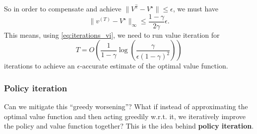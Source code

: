 \documentclass[../main/main]{subfiles}
\begin{document}
So in order to compensate and achieve $\|V^{\hat \pi} - V^{\star}\| \le \epsilon$, we must have
\[
    \|v^{(T)} - V^\star\|_{\infty} \le \frac{1-\gamma}{2 \gamma} \epsilon.
\]
This means, using \ref{eq:iterations_vi}, we need to run value iteration for
\[
    T = O\left( \frac{1}{1-\gamma} \log\left(\frac{\gamma}{\epsilon (1-\gamma)^2}\right) \right)
\]
iterations to achieve an $\epsilon$-accurate estimate of the optimal value function.

\subsubsection{Policy iteration}

Can we mitigate this ``greedy worsening''? What if instead of approximating the optimal value function and then acting greedily w.r.t. it, we iteratively improve the policy and value function together? This is the idea behind \textbf{policy iteration}.
\end{document}

